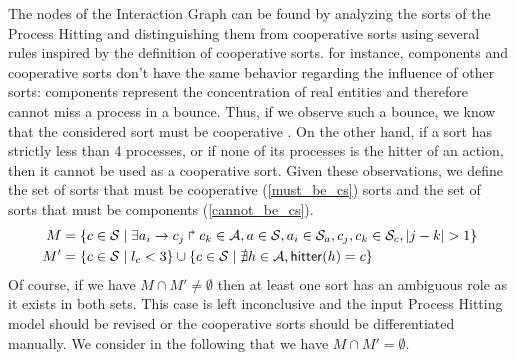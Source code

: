 The nodes of the Interaction Graph can be found by analyzing the sorts of the Process Hitting and distinguishing them from cooperative sorts using several rules inspired by the definition of cooperative sorts. for instance, components and cooperative sorts don't have the same behavior regarding the influence of other sorts: components represent the concentration of real entities and therefore cannot miss a process in a bounce. Thus, if we observe such a bounce, we know that the considered sort must be cooperative%
. On the other hand, if a sort has strictly less than 4 processes, or if none of its processes is the hitter of an action, then it cannot be used as a cooperative sort.%
Given these observations, we define the set of sorts that must be cooperative (\ref{must_be_cs}) sorts and the set of sorts that must be components (\ref{cannot_be_cs}).
\begin{align}
\label{must_be_cs}
  M &= \{c \in \mathcal{S} \mid \exists a_i\rightarrow c_j\Rsh c_k \in \mathcal{A}, a \in \mathcal{S}, a_i \in \mathcal{S}_a, c_j, c_k \in \mathcal{S}_c, |j - k| > 1\} \\
\label{cannot_be_cs}
  M' &= \{c \in \mathcal{S} \mid l_c < 3\} \cup \{c \in \mathcal{S} \mid \nexists h \in \mathcal{A}, \mathsf{hitter}(h) = c\}
\end{align}
Of course, if we have $M \cap M' \neq \emptyset$ then at least one sort has an ambiguous role as it exists in both sets. This case is left inconclusive and the input Process Hitting model should be revised or the cooperative sorts should be differentiated manually. We consider in the following that we have $M \cap M' = \emptyset$.

